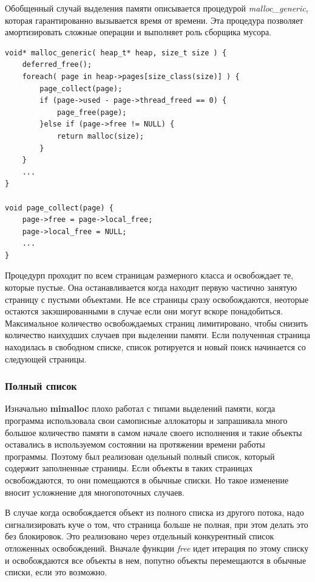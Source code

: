Обобщенный случай выделения памяти описывается процедурой \textit{malloc\_generic}, которая гарантированно вызывается время от времени. Эта процедура позволяет амортизировать сложные операции и выполняет роль сборщика мусора.

\begin{lstlisting}
void* malloc_generic( heap_t* heap, size_t size ) {
	deferred_free();
	foreach( page in heap->pages[size_class(size)] ) {
		page_collect(page);
		if (page->used - page->thread_freed == 0) {
			page_free(page);
		}else if (page->free != NULL) {
			return malloc(size);
		}
	}
	...
}

void page_collect(page) {
	page->free = page->local_free;
	page->local_free = NULL;
	...
}
\end{lstlisting}

Процедурп проходит по всем страницам размерного класса и освобождает те, которые пустые. Она останавливается когда находит первую частично занятую страницу с пустыми объектами. Не все страницы сразу освобождаются, неоторые остаются закэшированными в случае если они могут вскоре понадобиться. Максимальное количество освобождаемых страниц лимитировано, чтобы снизить количество наихудших случаев при выделении памяти. Если полученная страница находилась в свободном списке, список ротируется и новый поиск начинается со следующей страницы.

\subsubsection{Полный список}

Изначально \textbf{mimalloc} плохо работал с типами выделений памяти, когда программа использовала свои самописные аллокаторы и запрашивала много большое количество памяти в самом начале своего исполнения и такие объекты оставались в используемом состоянии на протяжении времени работы программы. Поэтому был реализован одельный полный список, который содержит заполненные страницы. Если объекты в таких страницах освобождаются, то они помещаются в обычные списки. Но такое изменение вносит усложнение для многопоточных случаев.

В случае когда освобождается объект из полного списка из другого потока, надо сигнализировать куче о том, что страница больше не полная, при этом делать это без блокировок. Это реализовано через отдельный конкурентный список отложенных освобождений. Вначале функции \textit{free} идет итерация по этому списку и освобождаются все объекты в нем, попутно объекты перемещаются в обычные списки, если это возможно.

